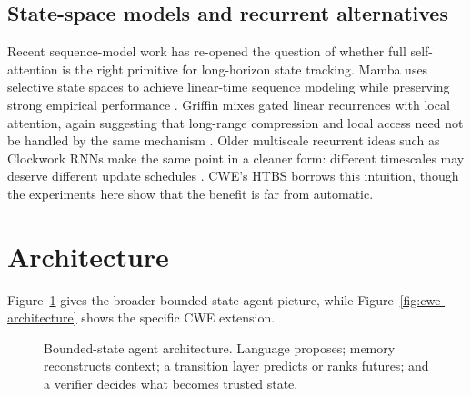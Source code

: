 \documentclass[11pt]{article}
\begin{document}
\subsection{State-space models and recurrent alternatives}
Recent sequence-model work has re-opened the question of whether full self-attention is the right primitive for long-horizon state tracking. Mamba uses selective state spaces to achieve linear-time sequence modeling while preserving strong empirical performance \citep{gu2023mamba}. Griffin mixes gated linear recurrences with local attention, again suggesting that long-range compression and local access need not be handled by the same mechanism \citep{de2024griffin}. Older multiscale recurrent ideas such as Clockwork RNNs make the same point in a cleaner form: different timescales may deserve different update schedules \citep{koutnik2014clockwork}. CWE's HTBS borrows this intuition, though the experiments here show that the benefit is far from automatic.

\section{Architecture}
Figure~\ref{fig:modular-architecture} gives the broader bounded-state agent picture, while Figure~\ref{fig:cwe-architecture} shows the specific CWE extension.

\begin{figure}[t]
\centering
{}
\caption{Bounded-state agent architecture. Language proposes; memory reconstructs context; a transition layer predicts or ranks futures; and a verifier decides what becomes trusted state.}
\label{fig:modular-architecture}
\end{figure}
\end{document}
